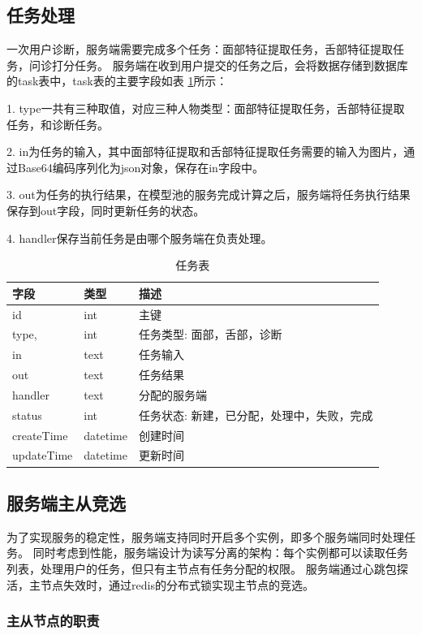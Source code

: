 \subsection{任务处理}
一次用户诊断，服务端需要完成多个任务：面部特征提取任务，舌部特征提取任务，问诊打分任务。
服务端在收到用户提交的任务之后，会将数据存储到数据库的task表中，task表的主要字段如表 \ref{tab:task}所示：

1. type一共有三种取值，对应三种人物类型：面部特征提取任务，舌部特征提取任务，和诊断任务。

2. in为任务的输入，其中面部特征提取和舌部特征提取任务需要的输入为图片，通过Base64编码序列化为json对象，保存在in字段中。

3. out为任务的执行结果，在模型池的服务完成计算之后，服务端将任务执行结果保存到out字段，同时更新任务的状态。

4. handler保存当前任务是由哪个服务端在负责处理。

\begin{table}[]
    \centering
    \begin{tabular}{lll}
        \toprule
        字段 & 类型 & 描述 \\ 
        \midrule
        id & int & 主键 \\
        type, & int & 任务类型: 面部，舌部，诊断 \\ 
        in & text & 任务输入 \\
        out & text & 任务结果 \\
        handler & text & 分配的服务端 \\
        status & int & 任务状态: 新建，已分配，处理中，失败，完成 \\
        createTime & datetime & 创建时间 \\
        updateTime & datetime & 更新时间\\
        \bottomrule
    \end{tabular}
    \caption{任务表}
    \label{tab:task}
\end{table}

\subsection{服务端主从竞选}
为了实现服务的稳定性，服务端支持同时开启多个实例，即多个服务端同时处理任务。
同时考虑到性能，服务端设计为读写分离的架构：每个实例都可以读取任务列表，处理用户的任务，但只有主节点有任务分配的权限。
服务端通过心跳包探活，主节点失效时，通过redis的分布式锁实现主节点的竞选。


\subsubsection{主从节点的职责}


